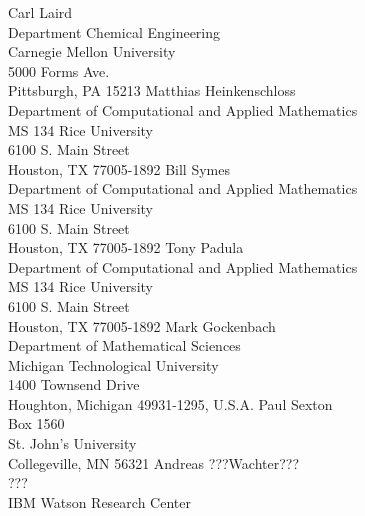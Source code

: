 \documentclass[pdf,ps2pdf,11pt]{SANDreport}
\begin{document}
%
%


%
\begin{SANDdistribution}
%

 Carl Laird \\ Department Chemical Engineering\\Carnegie Mellon University\\5000 Forms Ave.\\Pittsburgh, PA 15213
 Matthias Heinkenschloss \\ Department of Computational and Applied Mathematics\\MS 134 Rice University\\
6100 S. Main Street\\Houston, TX 77005-1892
 Bill Symes\\Department of Computational and Applied Mathematics\\MS 134 Rice University\\
6100 S. Main Street\\Houston, TX 77005-1892
 Tony Padula\\Department of Computational and Applied Mathematics\\MS 134 Rice University\\
6100 S. Main Street\\Houston, TX 77005-1892
 Mark Gockenbach \\ Department of Mathematical Sciences\\Michigan Technological University\\ 
1400 Townsend Drive\\Houghton, Michigan 49931-1295, U.S.A.
 Paul Sexton \\ Box 1560 \\ St. John's University \\ Collegeville, MN 56321
 Andreas ???Wachter??? \\ ??? \\ IBM Watson Research Center \\

\end{SANDdistribution}
\end{document}
